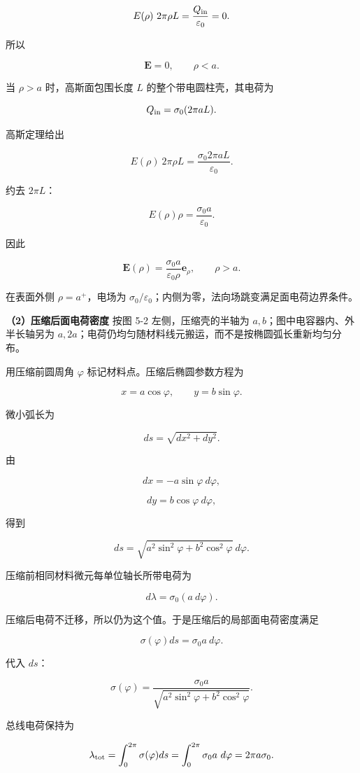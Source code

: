 \documentclass[12pt,a4paper,UTF8]{ctexart}
\begin{document}
\[E(\rho)\ 2\pi\rho L=\frac{Q_{\rm in}}{\varepsilon_0}=0.\]

所以

\[\boxed{\bm E=0,\qquad \rho<a}.\]

当 \(\rho>a\) 时，高斯面包围长度 \(L\) 的整个带电圆柱壳，其电荷为

\[Q_{\rm in}=\sigma_0(2\pi aL).\]

高斯定理给出

\[E(\rho)\ 2\pi\rho L=\frac{\sigma_0 2\pi aL}{\varepsilon_0}.\]

约去 \(2\pi L\)：

\[E(\rho)\rho=\frac{\sigma_0a}{\varepsilon_0}.\]

因此

\[\boxed{
\bm E(\rho)=\frac{\sigma_0a}{\varepsilon_0\rho}\bm e_\rho,
\qquad \rho>a
}.\]

在表面外侧 \(\rho=a^+\)，电场为
\(\sigma_0/\varepsilon_0\)；内侧为零，法向场跳变满足面电荷边界条件。

\textbf{（2）压缩后面电荷密度} 按图 5-2 左侧，压缩壳的半轴为
\(a,b\)；图中电容器内、外半长轴另为
\(a,2a\)；电荷仍均匀随材料线元搬运，而不是按椭圆弧长重新均匀分布。

用压缩前圆周角 \(\varphi\) 标记材料点。压缩后椭圆参数方程为

\[x=a\cos\varphi,
\qquad y=b\sin\varphi.\]

微小弧长为

\[ds=\sqrt{dx^2+dy^2}.\]

由

\[dx=-a\sin\varphi\ d\varphi,\]

\[dy=b\cos\varphi\ d\varphi,\]

得到

\[ds=\sqrt{a^2\sin^2\varphi+b^2\cos^2\varphi}\ d\varphi.\]

压缩前相同材料微元每单位轴长所带电荷为

\[d\lambda=\sigma_0(a\ d\varphi).\]

压缩后电荷不迁移，所以仍为这个值。于是压缩后的局部面电荷密度满足

\[\sigma(\varphi)ds=\sigma_0a\ d\varphi.\]

代入 \(ds\)：

\[\boxed{
\sigma(\varphi)=
\frac{\sigma_0a}
{\sqrt{a^2\sin^2\varphi+b^2\cos^2\varphi}}
}.\]

总线电荷保持为

\[\lambda_{\rm tot}=\int_0^{2\pi}\sigma(\varphi)ds
=\int_0^{2\pi}\sigma_0a\ d\varphi
=2\pi a\sigma_0.\]
\end{document}
